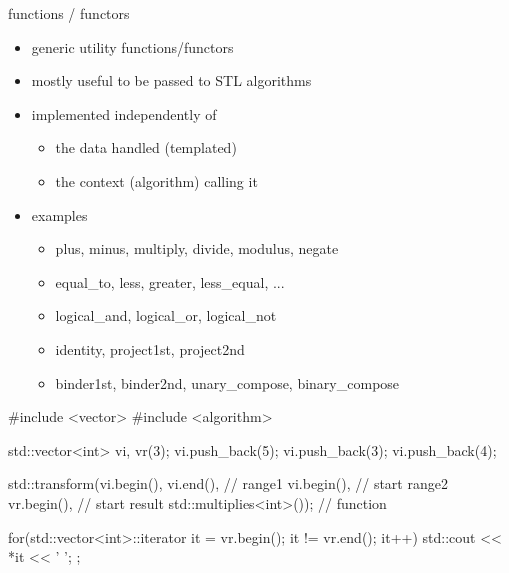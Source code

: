 \begin{frame}[fragile]
  \begin{block}{functions / functors}
    \begin{itemize}
      \item generic utility functions/functors
      \item mostly useful to be passed to STL algorithms
    \item implemented independently of
      \begin{itemize}
      \item the data handled (templated)
      \item the context (algorithm) calling it
      \end{itemize}
    \item examples
      \begin{itemize}
      \item plus, minus, multiply, divide, modulus, negate
      \item equal\_to, less, greater, less\_equal, ...
      \item logical\_and, logical\_or, logical\_not
      \item identity, project1st, project2nd
      \item binder1st, binder2nd, unary\_compose, binary\_compose
      \end{itemize}
    \end{itemize}
  \end{block}
\end{frame}


\begin{frame}[fragile]
  \begin{cppcode*}{}
    #include <vector>
    #include <algorithm>

    std::vector<int> vi, vr(3);
    vi.push_back(5); vi.push_back(3); vi.push_back(4);

    std::transform(vi.begin(), vi.end(),      // range1
                   vi.begin(),          // start range2
                   vr.begin(),          // start result
                   std::multiplies<int>()); // function

    for(std::vector<int>::iterator it = vr.begin();
        it != vr.end();
        it++) {
      std::cout << *it << ' ';
    };
  \end{cppcode*}
\end{frame}

